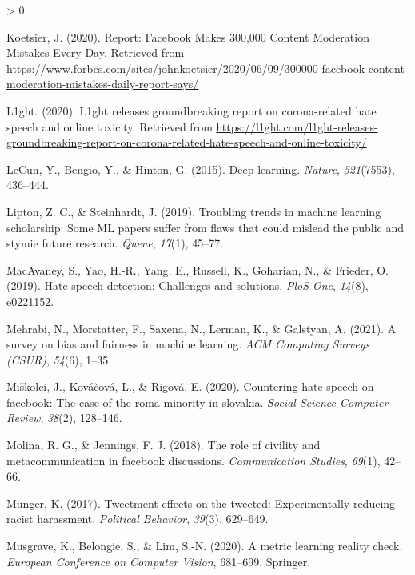 \documentclass[
  10pt,
  dvipsnames,enabledeprecatedfontcommands]{scrartcl}
\newlength{\cslhangindent}
\newenvironment{CSLReferences}[2] %
 {%
  \setlength{\parindent}{0pt}
  \ifodd #1 \everypar{\setlength{\hangindent}{\cslhangindent}}\ignorespaces\fi
  \ifnum #2 > 0
  \setlength{\parskip}{#2\baselineskip}
  \fi
 }%
 {}
\begin{document}
\begin{CSLReferences}{1}{0}
\leavevmode\hypertarget{ref-koetsier_report}{}%
Koetsier, J. (2020). Report: {Facebook} {Makes} 300,000 {Content}
{Moderation} {Mistakes} {Every} {Day}. Retrieved from
\url{https://www.forbes.com/sites/johnkoetsier/2020/06/09/300000-facebook-content-moderation-mistakes-daily-report-says/}

\leavevmode\hypertarget{ref-noauthor_l1ght_2020}{}%
L1ght. (2020). L1ght releases groundbreaking report on corona-related
hate speech and online toxicity. Retrieved from
\url{https://l1ght.com/l1ght-releases-groundbreaking-report-on-corona-related-hate-speech-and-online-toxicity/}

\leavevmode\hypertarget{ref-lecun2015deep}{}%
LeCun, Y., Bengio, Y., \& Hinton, G. (2015). Deep learning.
\emph{Nature}, \emph{521}(7553), 436--444.

\leavevmode\hypertarget{ref-lipton2019troubling}{}%
Lipton, Z. C., \& Steinhardt, J. (2019). Troubling trends in machine
learning scholarship: Some ML papers suffer from flaws that could
mislead the public and stymie future research. \emph{Queue},
\emph{17}(1), 45--77.

\leavevmode\hypertarget{ref-macavaney2019hate}{}%
MacAvaney, S., Yao, H.-R., Yang, E., Russell, K., Goharian, N., \&
Frieder, O. (2019). Hate speech detection: Challenges and solutions.
\emph{PloS One}, \emph{14}(8), e0221152.

\leavevmode\hypertarget{ref-mehrabi2021survey}{}%
Mehrabi, N., Morstatter, F., Saxena, N., Lerman, K., \& Galstyan, A.
(2021). A survey on bias and fairness in machine learning. \emph{ACM
Computing Surveys (CSUR)}, \emph{54}(6), 1--35.

\leavevmode\hypertarget{ref-mivskolci2020countering}{}%
Miškolci, J., Kováčová, L., \& Rigová, E. (2020). Countering hate speech
on facebook: The case of the roma minority in slovakia. \emph{Social
Science Computer Review}, \emph{38}(2), 128--146.

\leavevmode\hypertarget{ref-molina2018role}{}%
Molina, R. G., \& Jennings, F. J. (2018). The role of civility and
metacommunication in facebook discussions. \emph{Communication Studies},
\emph{69}(1), 42--66.

\leavevmode\hypertarget{ref-munger2017tweetment}{}%
Munger, K. (2017). Tweetment effects on the tweeted: Experimentally
reducing racist harassment. \emph{Political Behavior}, \emph{39}(3),
629--649.

\leavevmode\hypertarget{ref-musgrave2020metric}{}%
Musgrave, K., Belongie, S., \& Lim, S.-N. (2020). A metric learning
reality check. \emph{European Conference on Computer Vision}, 681--699.
Springer.


\end{CSLReferences}
\end{document}
